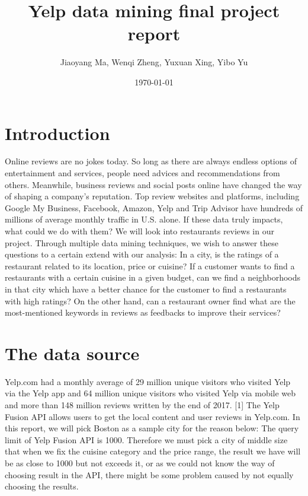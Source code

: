 \documentclass[a4paper]{article}
\title{Yelp data mining final project report}
\author{Jiaoyang Ma, Wenqi Zheng, Yuxuan Xing, Yibo Yu}
\date{\today}
\begin{document}
\maketitle

\section{Introduction}
\label{sec:introduction}

Online reviews are no jokes today. So long as there are always endless options of entertainment and services, people need advices and recommendations from others. Meanwhile, business reviews and social posts online have changed the way of shaping a company's reputation. Top review websites and platforms, including Google My Business, Facebook, Amazon, Yelp and Trip Advisor have hundreds of millions of average monthly traffic in U.S. alone. If these data truly impacts, what could we do with them?
We will look into restaurants reviews in our project. Through multiple data mining techniques, we wish to answer these questions to a certain extend with our analysis: In a city, is the ratings of a restaurant related to its location, price or cuisine? If a customer wants to find a restaurants with a certain cuisine in a given budget, can we find a neighborhoods in that city which have a better chance for the customer to find a restaurants with high ratings? On the other hand, can a restaurant owner find what are the most-mentioned keywords in reviews as feedbacks to improve their services?

 
\section{The data source}
\label{sec:introduction}

Yelp.com had a monthly average of 29 million unique visitors who visited Yelp via the Yelp app and 64 million unique visitors who visited Yelp via mobile web and more than 148 million reviews written by the end of 2017. [1] 
The Yelp Fusion API allows users to get the local content and user reviews in Yelp.com. 
In this report, we will pick Boston as a sample city for the reason below: The query limit of Yelp Fusion API is 1000. Therefore we must pick a city of middle size that when we fix the cuisine category and the price range, the result we have will be as close to 1000 but not exceeds it, or as we could not know the way of choosing result in the API, there might be some problem caused by not equally choosing the results.
\end{document}
